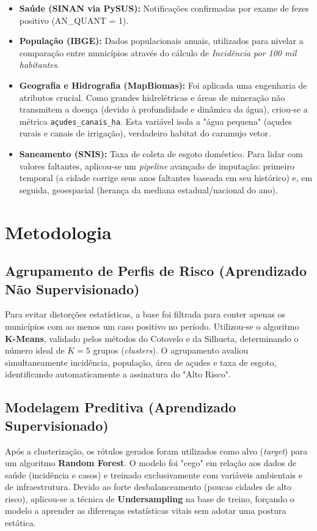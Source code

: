 \documentclass[12pt,a4paper]{article}
\begin{document}
\begin{itemize}
    \item \textbf{Saúde (SINAN via PySUS):} Notificações confirmadas por exame de fezes positivo (AN\_QUANT = 1).
    \item \textbf{População (IBGE):} Dados populacionais anuais, utilizados para nivelar a comparação entre municípios através do cálculo de \textit{Incidência por 100 mil habitantes}.
    \item \textbf{Geografia e Hidrografia (MapBiomas):} Foi aplicada uma engenharia de atributos crucial. Como grandes hidrelétricas e áreas de mineração não transmitem a doença (devido à profundidade e dinâmica da água), criou-se a métrica \texttt{açudes\_canais\_ha}. Esta variável isola a "água pequena" (açudes rurais e canais de irrigação), verdadeiro habitat do caramujo vetor.
    \item \textbf{Saneamento (SNIS):} Taxa de coleta de esgoto doméstico. Para lidar com valores faltantes, aplicou-se um \textit{pipeline} avançado de imputação: primeiro temporal (a cidade corrige seus anos faltantes baseada em seu histórico) e, em seguida, geoespacial (herança da mediana estadual/nacional do ano).
\end{itemize}

\section{Metodologia}

\subsection{Agrupamento de Perfis de Risco (Aprendizado Não Supervisionado)}
Para evitar distorções estatísticas, a base foi filtrada para conter apenas os municípios com ao menos um caso positivo no período. Utilizou-se o algoritmo \textbf{K-Means}, validado pelos métodos do Cotovelo e da Silhueta, determinando o número ideal de $K=5$ grupos (\textit{clusters}). O agrupamento avaliou simultaneamente incidência, população, área de açudes e taxa de esgoto, identificando automaticamente a assinatura do "Alto Risco".

\subsection{Modelagem Preditiva (Aprendizado Supervisionado)}
Após a clusterização, os rótulos gerados foram utilizados como alvo (\textit{target}) para um algoritmo \textbf{Random Forest}. O modelo foi "cego" em relação aos dados de saúde (incidência e casos) e treinado exclusivamente com variáveis ambientais e de infraestrutura. Devido ao forte desbalanceamento (poucas cidades de alto risco), aplicou-se a técnica de \textbf{Undersampling} na base de treino, forçando o modelo a aprender as diferenças estatísticas vitais sem adotar uma postura estática.
\end{document}
